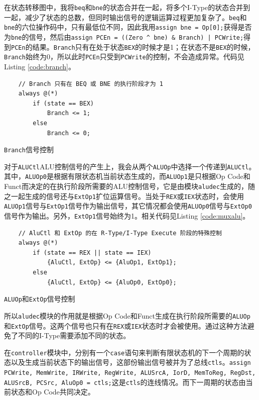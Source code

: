 \documentclass[12pt,a4paper]{article}
\newcommand{\incode}[1]{\texttt{#1}} %
\begin{document}
在状态转移图中，我将\incode{beq}和\incode{bne}的状态合并在一起，将多个I-Type的状态合并到一起，减少了状态的总数，但同时输出信号的逻辑运算过程更加复杂了。\incode{beq}和\incode{bne}的六位操作码中，只有最低位不同，因此我用\incode{assign bne = Op[0];}获得是否为\incode{bne}的信号，然后由\incode{assign PCEn = ((Zero ^ bne) & Branch) | PCWrite;}得到\incode{PCEn}的结果。\incode{Branch}只有在处于状态\incode{BEX}的时候才是1；在状态不是\incode{BEX}的时候，\incode{Branch}始终为0，所以此时\incode{PCEn}只受到\incode{PCWrite}的控制，不会造成异常。代码见Listing \ref{code:branch}。

\begin{listing}[ht]
    \begin{verbatim}
    // Branch 只有在 BEQ 或 BNE 的执行阶段才为 1
    always @(*)
        if (state == BEX)
            Branch <= 1;
        else
            Branch <= 0;
	\end{verbatim}
	\caption{\incode{Branch}信号控制}
	\label{code:branch}
\end{listing}

对于\incode{ALUCtl}ALU控制信号的产生上，我会从两个\incode{ALUOp}中选择一个传递到\incode{ALUCtl}。其中，\incode{ALUOp0}是根据有限状态机当前状态生成的，而\incode{ALUOp1}是只根据Op Code和Funct而决定的在执行阶段所需要的ALU控制信号，它是由模块\incode{aludec}生成的，随之一起生成的信号还与\incode{ExtOp1}扩位运算信号。当处于\incode{REX}或\incode{IEX}状态时，会使用\incode{ALUOp1}信号与\incode{ExtOp1}信号作为输出信号，其它情况都会使用\incode{ALUOp0}信号与\incode{ExtOp0}信号作为输出。另外，\incode{ExtOp1}信号始终为1。相关代码见Listing \ref{code:muxalu}。

\begin{listing}[ht]
    \begin{verbatim}
    // AluCtl 和 ExtOp 的在 R-Type/I-Type Execute 阶段的特殊控制
    always @(*)
        if (state == REX || state == IEX)
            {AluCtl, ExtOp} <= {AluOp1, ExtOp1};
        else
            {AluCtl, ExtOp} <= {AluOp0, ExtOp0};
	\end{verbatim}
	\caption{\incode{ALUOp}和\incode{ExtOp}信号控制}
	\label{code:muxalu}
\end{listing}

所以\incode{aludec}模块的作用就是根据Op Code和Funct生成在执行阶段所需要的\incode{ALUOp}和\incode{ExtOp}信号。这两个信号也只有在\incode{REX}或\incode{IEX}状态时才会被使用。通过这种方法避免了不同的I-Type需要添加不同的状态。

在\incode{controller}模块中，分别有一个\incode{case}语句来判断有限状态机的下一个周期的状态以及生成当前状态下的输出信号，这部份输出信号被并为了总线\incode{ctls}。\incode{assign {PCWrite, MemWrite, IRWrite, RegWrite, ALUSrcA, IorD, MemToReg, RegDst, ALUSrcB, PCSrc, AluOp0} = ctls;}这是\incode{ctls}的连线情况。而下一周期的状态由当前状态和Op Code共同决定。
\end{document}
